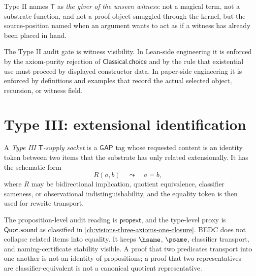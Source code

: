 \begin{definition}
\label{def:transcendental-supply-type-II-reading}
Type II names $\mathsf{T}$ as \emph{the giver of the unseen witness}: not a magical term, not a substrate function, and not a proof object smuggled through the kernel, but the source-position named when an argument wants to act as if a witness has already been placed in hand.
\end{definition}

\begin{remark}
\label{rem:transcendental-supply-type-II-gate}
The Type II audit gate is witness visibility. In Lean-side engineering it is enforced by the axiom-purity rejection of $\mathsf{Classical.choice}$ and by the rule that existential use must proceed by displayed constructor data. In paper-side engineering it is enforced by definitions and examples that record the actual selected object, recursion, or witness field.
\end{remark}

\section{Type III: extensional identification}
\label{sec:transcendental-supply-type-III}

\begin{definition}
\label{def:transcendental-supply-type-III}
A \emph{Type III $\mathsf{T}$-supply socket} is a $\mathsf{GAP}$ tag whose requested content is an identity token between two items that the substrate has only related extensionally. It has the schematic form
$$
R(a,b)
\quad\leadsto\quad
a=b,
$$
where $R$ may be bidirectional implication, quotient equivalence, classifier sameness, or observational indistinguishability, and the equality token is then used for rewrite transport.
\end{definition}

\begin{example}
\label{ex:transcendental-supply-type-III-engineering}
The proposition-level audit reading is $\mathsf{propext}$, and the type-level proxy is $\mathsf{Quot.sound}$ as classified in \autoref{ch:visions-three-axioms-one-closure}. BEDC does not collapse related items into equality. It keeps $\hsame$, $\psame$, classifier transport, and naming-certificate stability visible. A proof that two predicates transport into one another is not an identity of propositions; a proof that two representatives are classifier-equivalent is not a canonical quotient representative.
\end{example}

